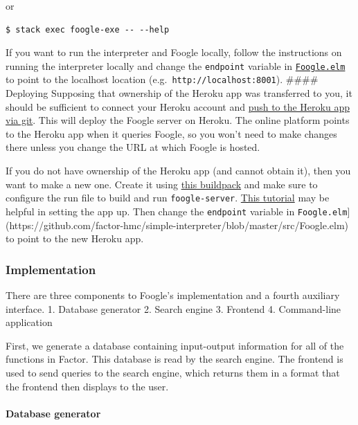 \documentclass[
]{article}
\begin{document}
or

\begin{verbatim}
$ stack exec foogle-exe -- --help
\end{verbatim}

If you want to run the interpreter and Foogle locally, follow the
instructions on running the interpreter locally and change the
\texttt{endpoint} variable in
\href{https://github.com/factor-hmc/simple-interpreter/blob/master/src/Foogle.elm}{\texttt{Foogle.elm}}
to point to the localhost location
(e.g.~\texttt{http://localhost:8001}). \#\#\#\# Deploying Supposing that
ownership of the Heroku app was transferred to you, it should be
sufficient to connect your Heroku account and
\href{https://devcenter.heroku.com/articles/git}{push to the Heroku app
via git}. This will deploy the Foogle server on Heroku. The online
platform points to the Heroku app when it queries Foogle, so you won't
need to make changes there unless you change the URL at which Foogle is
hosted.

If you do not have ownership of the Heroku app (and cannot obtain it),
then you want to make a new one. Create it using
\href{https://github.com/mfine/heroku-buildpack-stack}{this buildpack}
and make sure to configure the run file to build and run
\texttt{foogle-server}.
\href{https://hackernoon.com/for-all-the-world-to-see-deploying-haskell-with-heroku-7ea46f827ce}{This
tutorial} may be helpful in setting the app up. Then change the
\texttt{endpoint} variable in
\texttt{Foogle.elm}{]}(https://github.com/factor-hmc/simple-interpreter/blob/master/src/Foogle.elm)
to point to the new Heroku app.

\hypertarget{implementation}{%
\subsubsection{Implementation}\label{implementation}}

There are three components to Foogle's implementation and a fourth
auxiliary interface. 1. Database generator 2. Search engine 3. Frontend
4. Command-line application

First, we generate a database containing input-output information for
all of the functions in Factor. This database is read by the search
engine. The frontend is used to send queries to the search engine, which
returns them in a format that the frontend then displays to the user.

\hypertarget{database-generator}{%
\paragraph{Database generator}\label{database-generator}}
\end{document}
